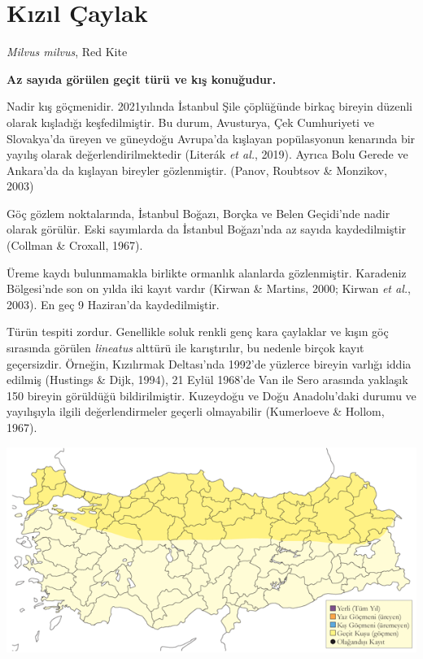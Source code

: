 \documentclass[
  a4paper,
  DIV=11,
  numbers=noendperiod]{scrreprt}
\begin{document}
\section{Kızıl Çaylak}\label{kux131zux131l-uxe7aylak}

\emph{Milvus milvus}, Red Kite

\textbf{Az sayıda görülen geçit türü ve kış konuğudur.}

Nadir kış göçmenidir. 2021yılında İstanbul Şile çöplüğünde birkaç
bireyin düzenli olarak kışladığı keşfedilmiştir. Bu durum, Avusturya,
Çek Cumhuriyeti ve Slovakya'da üreyen ve güneydoğu Avrupa'da kışlayan
popülasyonun kenarında bir yayılış olarak değerlendirilmektedir (Literák
\emph{et al.}, 2019). Ayrıca Bolu Gerede ve Ankara'da da kışlayan
bireyler gözlenmiştir. (Panov, Roubtsov \& Monzikov, 2003)

Göç gözlem noktalarında, İstanbul Boğazı, Borçka ve Belen Geçidi'nde
nadir olarak görülür. Eski sayımlarda da İstanbul Boğazı'nda az sayıda
kaydedilmiştir (Collman \& Croxall, 1967).

Üreme kaydı bulunmamakla birlikte ormanlık alanlarda gözlenmiştir.
Karadeniz Bölgesi'nde son on yılda iki kayıt vardır (Kirwan \& Martins,
2000; Kirwan \emph{et al.}, 2003). En geç 9 Haziran'da kaydedilmiştir.

Türün tespiti zordur. Genellikle soluk renkli genç kara çaylaklar ve
kışın göç sırasında görülen \emph{lineatus} alttürü ile karıştırılır, bu
nedenle birçok kayıt geçersizdir. Örneğin, Kızılırmak Deltası'nda
1992'de yüzlerce bireyin varlığı iddia edilmiş (Hustings \& Dijk, 1994),
21 Eylül 1968'de Van ile Sero arasında yaklaşık 150 bireyin görüldüğü
bildirilmiştir. Kuzeydoğu ve Doğu Anadolu'daki durumu ve yayılışıyla
ilgili değerlendirmeler geçerli olmayabilir (Kumerloeve \& Hollom,
1967).

\includegraphics{images/harita_Page_106.png}
\end{document}
